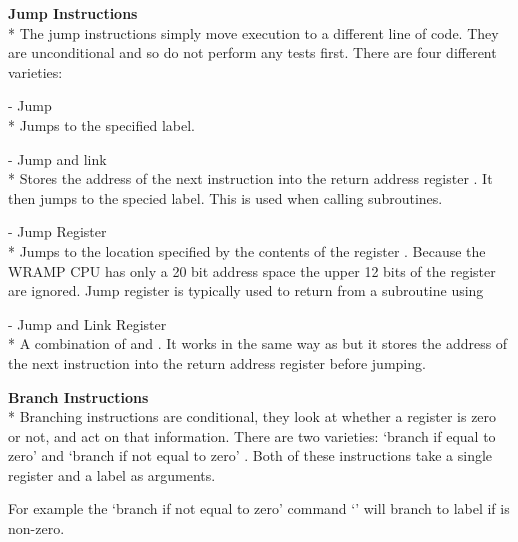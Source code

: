 \textbf{Jump Instructions}\\*
The jump instructions simply move execution to a different line of
code.  They are unconditional and so do not perform any tests first.
There are four different varieties:

  - Jump\\*
Jumps to the specified label.

 - Jump and link\\*
Stores the address of the next instruction into the return address register . It then jumps to the specied label. This is used when calling subroutines.

  -  Jump Register\\*
Jumps to the location specified by the contents of the register \regs.  
Because the WRAMP CPU has only a 20 bit address space the upper 12 bits 
of the register are ignored.  Jump register is typically used to 
return from a subroutine using 

 - Jump and Link Register\\* A combination of
 and . It works in the same way as  but it
stores the address of the next instruction into the return address
register before jumping. 

\textbf{Branch Instructions}\\*
Branching instructions are conditional, they look at whether a
register is zero or not, and act on that information.  There are two
varieties: `branch if equal to zero'  and `branch if not
equal to zero' .  Both of these instructions take a single
register and a label as arguments.

For example the `branch if not equal to zero' command 
`' will branch to label 
 if  is non-zero.

\begin{comment}
\subsection{I/O Routines}

In the example program you will see we have used the routines
\src{putstr}, \src{readnum} and \src{writenum} to perfrom input
and output.  These routines are in the file \LIBEXTWO, which we will 
\BI{link} to.  Here is an overview of the routines:
\begin{description}
\item[\src{putstr}] is used to write a string to the Linux machine.  Put the
address of the string into register \reg{2}.
\item[\src{readnum}] reads a number from the Linux machine, leaving it in
register \reg{1}.
\item[\src{writenum}] will write the number in register \reg{2} to the 
Linux machine.
\end{description}
\end{comment}

